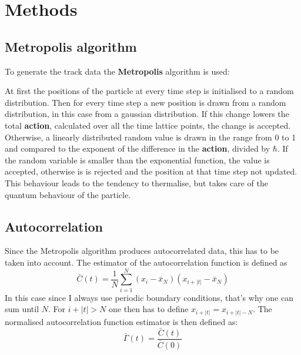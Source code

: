 \documentclass{scrartcl}
\begin{document}
	\section{Methods}

	\subsection{Metropolis algorithm}
		To generate the track data the \textbf{Metropolis} algorithm is used:

		At first the positions of the particle at every time step is initialised to a random distribution.
		Then for every time step a new position is drawn from a random distribution, in this case from a gaussian distribution.
		If this change lowers the total \textbf{action}, calculated over all the time lattice points, the change is accepted.
		Otherwise, a linearly distributed random value is drawn in the range from 0 to 1 and compared to the exponent of the difference in the \textbf{action}, divided by $\hbar$.
		If the random variable is smaller than the exponential function, the value is accepted, otherwise is is rejected and the position at that time step not updated.
		This behaviour leads to the tendency to thermalise, but takes care of the quantum behaviour of the particle.

	\subsection{Autocorrelation}
		Since the Metropolis algorithm produces autocorrelated data, this has to be taken into account.
		The estimator of the autocorrelation function is defined as
		\begin{equation}
			\bar C(t) = \frac 1{N} \sum_{i = 1}^{N} (x_i - \bar x_N)(x_{i + |t|} - \bar x_N)
			\label{eq:autocorrelation}
		\end{equation}
		In this case since I always use periodic boundary conditions, that's why one can sum until $N$.
		For $i + |t| > N$ one then has to define $x_{i + |t|} = x_{i + |t| - N}$.
		The normalised autocorrelation function estimator is then defined as:
		\begin{equation}
			\bar\Gamma(t) = \frac {\bar C(t)}{\bar C(0)}
			\label{eq:normalised_autocorrelation}
		\end{equation}
\end{document}

